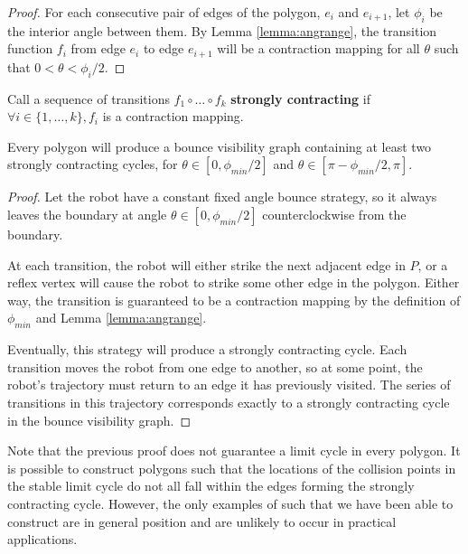 \documentclass[]{styles/svproc}  %
\begin{document}
\begin{proof}

For each consecutive pair of edges of the polygon, $e_i$ and $e_{i+1}$, let
$\phi_i$ be the interior angle between them. By Lemma \ref{lemma:angrange}, the
transition function $f_i$ from edge $e_i$ to edge $e_{i+1}$ will be a
contraction mapping for all $\theta$ such that $0 < \theta < \phi_i/2$.


\end{proof}

\begin{definition}
Call a sequence of transitions $f_1 \circ \ldots \circ f_k$ \textbf{strongly
contracting} if $\forall i \in \{1, \ldots, k\}, f_i$ is a contraction mapping.
\end{definition}

\begin{corollary}
Every polygon will produce a bounce visibility graph containing at least two
strongly contracting cycles, for $\theta \in [0, \phi_{min}/2]$ and $\theta \in
[\pi - \phi_{min}/2, \pi]$.
\end{corollary}

\begin{proof}

Let the robot have a constant fixed angle bounce strategy, so it always leaves
the boundary at angle $\theta \in [0,\phi_{min}/2]$ counterclockwise from the
boundary.

At each transition, the robot will either strike the next adjacent edge in
$P$, or a reflex vertex will cause the robot to strike some other edge in the
polygon. Either way, the transition is guaranteed to be a contraction mapping by
the definition of $\phi_{min}$ and Lemma \ref{lemma:angrange}.

Eventually, this strategy will produce a strongly contracting cycle. Each
transition moves the robot from one edge to another, so at some point, the
robot's trajectory must return to an edge it has previously visited. The series
of transitions in this trajectory corresponds exactly to a strongly contracting
cycle in the bounce visibility graph.

\end{proof}

Note that the previous proof does not guarantee a limit cycle in every polygon.
It is possible to construct polygons such that the locations of the collision
points in the stable limit cycle do not all fall within the edges forming the
strongly contracting cycle. However, the only examples of such that we have been
able to construct are in general position and are unlikely to occur in practical
applications.
\end{document}
